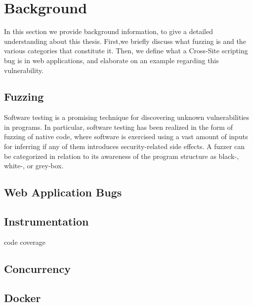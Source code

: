 \chapter{Background}
\label{sec:background}
\minitoc
\vspace*{1cm}

In this section we provide background information, to give a
detailed understanding about this thesis. First,we briefly discuss
what fuzzing is and the various categories that constitute
it. Then, we define what a Cross-Site scripting bug is in web
applications, and elaborate on an example regarding this
vulnerability.

\section{Fuzzing}
Software testing is a promising technique for discovering
unknown vulnerabilities in programs. In particular, software
testing has been realized in the form of fuzzing of native code,
where software is exercised using a vast amount of inputs
for inferring if any of them introduces security-related side
effects. A fuzzer can be categorized in relation to
its awareness of the program structure as black-, white-, or
grey-box.
\section{Web Application Bugs}


\section{Instrumentation}
code coverage

\section{Concurrency}

\section{Docker}
